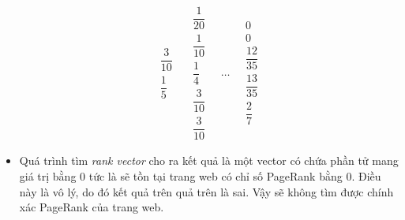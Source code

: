 \begin{itemize}
$$\begin{matrix}
                    \dfrac{3}{10} \\[10pt]
                    \dfrac{1}{5}
                \end{matrix}
                \quad
                \begin{matrix}
                    \dfrac{1}{20} \\[10pt]
                    \dfrac{1}{10} \\[10pt]
                    \dfrac{1}{4}\\[10pt]
                    \dfrac{3}{10} \\[10pt]
                    \dfrac{3}{10}
                \end{matrix}
                \quad
                \ldots
                \quad
                \begin{matrix}
                    0 \\[10pt]
                    0 \\[10pt]
                    \dfrac{12}{35}\\[10pt]
                    \dfrac{13}{35} \\[10pt]
                    \dfrac{2}{7}
                \end{matrix}
                $$ 
    \item Quá trình tìm \emph{rank vector} cho ra kết quả là một vector có chứa phần tử mang giá trị bằng 0 tức là sẽ tồn tại trang web có chỉ số PageRank bằng 0. Điều này là vô lý, do đó kết quả trên quả trên là sai. Vậy sẽ không tìm được chính xác PageRank của trang web. 
\end{itemize}

